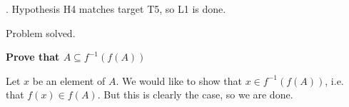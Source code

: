 \documentclass[a4paper,twoside,12pt]{article} %
\makeatletter
\DeclareRobustCommand{\_}{%
  \leavevmode\vbox{%
    \hrule\@width.4em
          \@height-.16ex
          \@depth\dimexpr.16ex+.28pt\relax}}
\newenvironment{fit}{\begin{adjustbox}{max width=\textwidth,max totalheight=\textheight,keepaspectratio}}{\end{adjustbox}}
\makeatother
\begin{document}
\begin{steps}
. Hypothesis H4 matches target T5, so L1 is done.\nopagebreak[4] 
\nopagebreak[4] 
\smallskip\nopagebreak[4] 

\begin{fit}%
\end{fit}

Problem solved.
\cleardoublepage

\end{steps}
{\begin{center} \large \textbf{Prove that $A \subseteq f^{-1}(f(A))$}\end{center}}\nopagebreak[4]

\begin{center}
\begin{minipage}{120mm}
Let $x$ be an element of $A$. We would like to show that $x\in f^{-1}(f(A))$, i.e. that $f(x)\in f(A)$. But this is clearly the case, so we are done.
\end{minipage}
\end{center}
\end{document}
